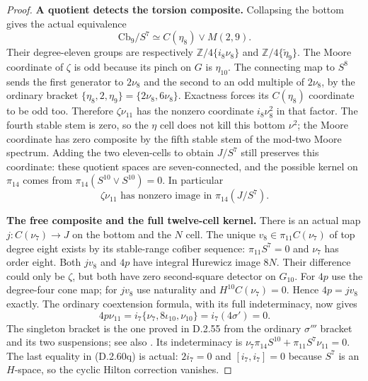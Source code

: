 \begin{proof}
\textbf{A quotient detects the torsion composite.}
Collapsing the bottom gives the actual equivalence
\[
 \mathrm{Cb}_9/S^7\simeq C(\eta_8)\vee M(2,9).
 \tag{D.2.60o}
\]
Their degree-eleven groups are respectively
$\mathbb Z/4\{i_8\nu_8\}$ and
$\mathbb Z/4\{\widetilde\eta_9\}$.
The Moore coordinate of $\zeta$ is odd because its pinch
on $G$ is $\eta_{10}$.  The connecting map to $S^8$
sends the first generator to $2\nu_8$ and the second
to an odd multiple of $2\nu_8$, by the ordinary bracket
$\{\eta_8,2,\eta_9\}=\{2\nu_8,6\nu_8\}$.
Exactness forces its $C(\eta_8)$ coordinate to be odd too.
Therefore $\zeta\nu_{11}$ has the nonzero coordinate
$i_8\nu_8^2$ in that factor.  The fourth stable stem is
zero, so the $\eta$ cell does not kill this bottom
$\nu^2$; the Moore coordinate has zero composite by
the fifth stable stem of the mod-two Moore spectrum.
Adding the two eleven-cells to obtain $J/S^7$ still
preserves this coordinate: these quotient spaces are
seven-connected, and the possible kernel on $\pi_{14}$
comes from $\pi_{14}(S^{10}\vee S^{10})=0$.
In particular
\[
 \zeta\nu_{11}\text{ has nonzero image in }\pi_{14}(J/S^7).
 \tag{D.2.60p}
\]

\textbf{The free composite and the full twelve-cell kernel.}
There is an actual map $j:C(\nu_7)\to J$ on the bottom
and the $N$ cell.  The unique $v_8\in\pi_{11}C(\nu_7)$
of top degree eight exists by its stable-range cofiber
sequence: $\pi_{11}S^7=0$ and $\nu_7$ has order eight.
Both $jv_8$ and $4p$ have integral Hurewicz image $8N$.
Their difference could only be $\zeta$, but both have
zero second-square detector on $G_{10}$.  For $4p$ use
the degree-four cone map; for $jv_8$ use naturality and
$H^{10}C(\nu_7)=0$.  Hence $4p=jv_8$ exactly.
The ordinary coextension formula, with its full
indeterminacy, now gives
\[
 4p\nu_{11}=i_7\{\nu_7,8\iota_{10},\nu_{10}\}
            =i_7(4\sigma')=0.
 \tag{D.2.60q}
\]
The singleton bracket is the one proved in D.2.55 from
the ordinary $\sigma'''$ bracket and its two suspensions;
see also \cite[Section~2.5 and accompanying program]
{FGHStricklandToda}.  Its indeterminacy is
$\nu_7\pi_{14}S^{10}+\pi_{11}S^7\nu_{11}=0$.
The last equality in \textup{(D.2.60q)} is actual:
$2i_7=0$ and $[i_7,i_7]=0$ because $S^7$ is an
$H$-space, so the cyclic Hilton correction vanishes.


\end{proof}
